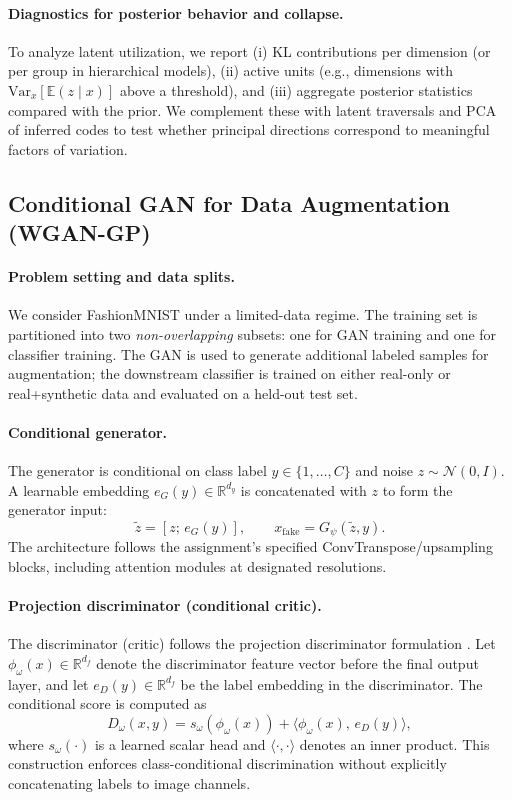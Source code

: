 \paragraph{Diagnostics for posterior behavior and collapse.}
To analyze latent utilization, we report (i) KL contributions per dimension (or per group in hierarchical models), (ii) active units (e.g., dimensions with $\mathrm{Var}_x[\mathbb{E}(z\mid x)]$ above a threshold), and (iii) aggregate posterior statistics compared with the prior. We complement these with latent traversals and PCA of inferred codes to test whether principal directions correspond to meaningful factors of variation.


\subsection{Conditional GAN for Data Augmentation (WGAN-GP)}
\paragraph{Problem setting and data splits.}
We consider FashionMNIST under a limited-data regime. The training set is partitioned into two \emph{non-overlapping} subsets: one for GAN training and one for classifier training. The GAN is used to generate additional labeled samples for augmentation; the downstream classifier is trained on either real-only or real+synthetic data and evaluated on a held-out test set.

\paragraph{Conditional generator.}
The generator is conditional on class label $y\in\{1,\dots,C\}$ and noise $z\sim\mathcal{N}(0,I)$. A learnable embedding $e_G(y)\in\mathbb{R}^{d_y}$ is concatenated with $z$ to form the generator input:
\[
\tilde{z} = [z;\,e_G(y)],\qquad x_{\mathrm{fake}} = G_\psi(\tilde{z},y).
\]
The architecture follows the assignment's specified ConvTranspose/upsampling blocks, including attention modules at designated resolutions.

\paragraph{Projection discriminator (conditional critic).}
The discriminator (critic) follows the projection discriminator formulation \citep{miyato2018projection}. Let $\phi_\omega(x)\in\mathbb{R}^{d_f}$ denote the discriminator feature vector before the final output layer, and let $e_D(y)\in\mathbb{R}^{d_f}$ be the label embedding in the discriminator. The conditional score is computed as
\[
D_\omega(x,y)=
s_\omega(\phi_\omega(x)) + \langle \phi_\omega(x),\, e_D(y)\rangle,
\]
where $s_\omega(\cdot)$ is a learned scalar head and $\langle\cdot,\cdot\rangle$ denotes an inner product. This construction enforces class-conditional discrimination without explicitly concatenating labels to image channels.


